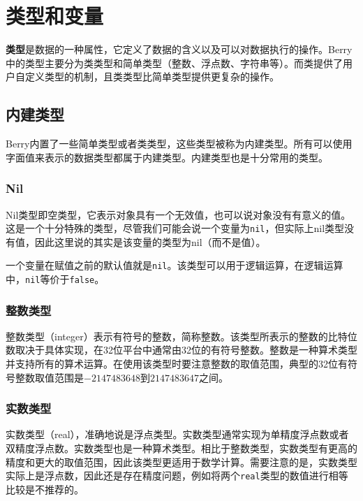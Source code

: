 \chapter{类型和变量}

\textbf{类型}是数据的一种属性，它定义了数据的含义以及可以对数据执行的操作。Berry中的类型主要分为类类型和简单类型（整数、浮点数、字符串等）。而类提供了用户自定义类型的机制，且类类型比简单类型提供更复杂的操作。

\section{内建类型}

Berry内置了一些简单类型或者类类型，这些类型被称为内建类型。所有可以使用字面值来表示的数据类型都属于内建类型。内建类型也是十分常用的类型。

\subsection{Nil}

Nil类型即空类型，它表示对象具有一个无效值，也可以说对象没有有意义的值。这是一个十分特殊的类型，尽管我们可能会说一个变量为\texttt{nil}，但实际上nil类型没有值，因此这里说的其实是该变量的类型为nil（而不是值）。

一个变量在赋值之前的默认值就是\texttt{nil}。该类型可以用于逻辑运算，在逻辑运算中，\texttt{nil}等价于\texttt{false}。

\subsection{整数类型}

整数类型（integer）表示有符号的整数，简称整数。该类型所表示的整数的比特位数取决于具体实现，在32位平台中通常由32位的有符号整数。整数是一种算术类型并支持所有的算术运算。在使用该类型时要注意整数的取值范围，典型的32位有符号整数取值范围是$-2147483648$到$2147483647$之间。

\subsection{实数类型}

实数类型（real），准确地说是浮点类型。实数类型通常实现为单精度浮点数或者双精度浮点数。实数类型也是一种算术类型。相比于整数类型，实数类型有更高的精度和更大的取值范围，因此该类型更适用于数学计算。需要注意的是，实数类型实际上是浮点数，因此还是存在精度问题，例如将两个\texttt{real}类型的数值进行相等比较是不推荐的。

